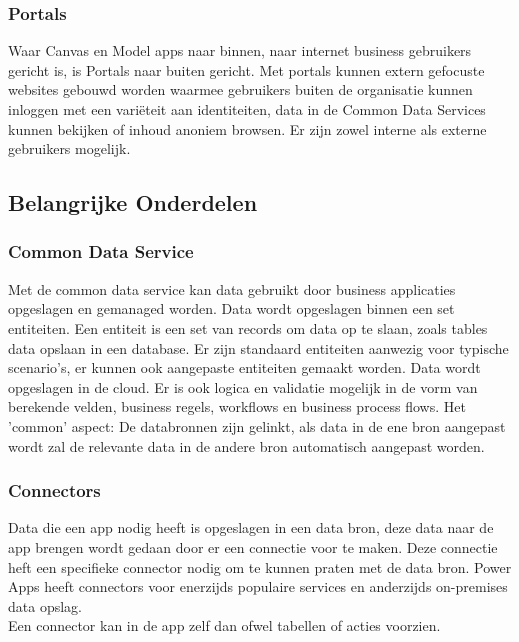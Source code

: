 \subsubsection{Portals}

Waar Canvas en Model apps naar binnen, naar internet business gebruikers gericht is, is Portals naar buiten gericht. Met portals kunnen extern gefocuste websites gebouwd worden waarmee gebruikers buiten de organisatie kunnen inloggen met een variëteit aan identiteiten, data in de Common Data Services kunnen bekijken of inhoud anoniem browsen. Er zijn zowel interne als externe gebruikers mogelijk. \autocite{MicrosoftDocs2020a}

\subsection{Belangrijke Onderdelen}

\subsubsection{Common Data Service}

Met de common data service kan data gebruikt door business applicaties opgeslagen en gemanaged worden. Data wordt opgeslagen binnen een set entiteiten. Een entiteit is een set van records om data op te slaan, zoals tables data opslaan in een database. Er zijn standaard entiteiten aanwezig voor typische scenario's, er kunnen ook aangepaste entiteiten gemaakt worden. Data wordt opgeslagen in de cloud. Er is ook logica en validatie mogelijk in de vorm van berekende velden, business regels, workflows en business process flows. Het 'common' aspect: De databronnen zijn gelinkt, als data in de ene bron aangepast wordt zal de relevante data in de andere bron automatisch aangepast worden. \autocite{MicrosoftDocs2019a}

\subsubsection{Connectors}

Data die een app nodig heeft is opgeslagen in een data bron, deze data naar de app brengen wordt gedaan door er een connectie voor te maken. Deze connectie heft een specifieke connector nodig om te kunnen praten met de data bron. Power Apps heeft connectors voor enerzijds populaire services en anderzijds on-premises data opslag. \\
Een connector kan in de app zelf dan ofwel tabellen of acties voorzien.

